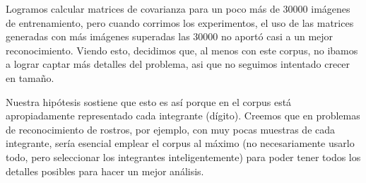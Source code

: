 Logramos calcular matrices de covarianza para un poco m\'as de 30000 im\'agenes de entrenamiento, pero cuando
corrimos los experimentos, el uso de las matrices generadas con m\'as im\'agenes superadas las 30000 no aport\'o casi a un mejor reconocimiento.
Viendo esto, decidimos que, al menos con este corpus, no ibamos a lograr captar m\'as detalles del problema,
asi que no seguimos intentado crecer en tama\~no.

Nuestra hip\'otesis sostiene que esto es as\'i porque en el corpus est\'a apropiadamente
representado cada integrante (d\'igito). Creemos que en problemas de
reconocimiento de rostros, por ejemplo, con muy pocas muestras de cada integrante,
ser\'ia esencial emplear el corpus al m\'aximo (no necesariamente usarlo todo, pero seleccionar los
integrantes inteligentemente) para poder tener todos los detalles posibles para hacer un mejor an\'alisis.
